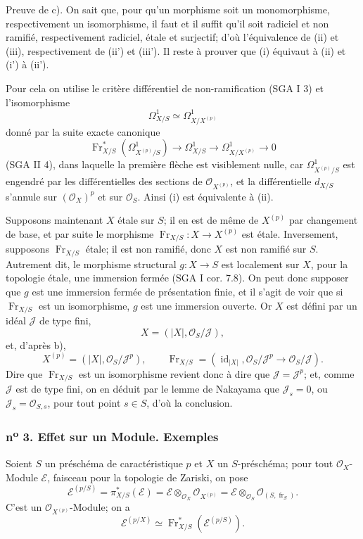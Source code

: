 \documentclass[11pt]{article}
\providecommand{\OO}{\mathcal{O}}
\providecommand{\id}{\operatorname{id}}
\providecommand{\cE}{\mathcal E}
\providecommand{\id}{\operatorname{id}}
\providecommand{\id}{\operatorname{id}}
\providecommand{\id}{\operatorname{id}}
\providecommand{\id}{\operatorname{id}}
\providecommand{\fr}{\operatorname{fr}}
\providecommand{\Fr}{\operatorname{Fr}}
\providecommand{\JJ}{\mathcal J}
\providecommand{\Fr}{\operatorname{Fr}}
\providecommand{\fr}{\operatorname{fr}}
\providecommand{\id}{\operatorname{id}}
\begin{document}
Preuve de c). On sait que, pour qu'un morphisme soit un monomorphisme, respectivement un isomorphisme, il faut et il suffit qu'il soit radiciel et non ramifié, respectivement radiciel, étale et surjectif; d'où l'équivalence de (ii) et (iii), respectivement de (ii') et (iii'). Il reste à prouver que (i) équivaut à (ii) et (i') à (ii').

Pour cela on utilise le critère différentiel de non-ramification (SGA I 3) et l'isomorphisme
\[
\Omega^1_{X/S}\simeq \Omega^1_{X/X^{(p)}}
\]
donné par la suite exacte canonique
\[
\Fr_{X/S}^*(\Omega^1_{X^{(p)}/S})\longrightarrow \Omega^1_{X/S}
\longrightarrow \Omega^1_{X/X^{(p)}}\longrightarrow 0
\]
(SGA II 4), dans laquelle la première flèche est visiblement nulle, car $\Omega^1_{X^{(p)}/S}$ est engendré par les différentielles des sections de $\OO_{X^{(p)}}$, et la différentielle $d_{X/S}$ s'annule sur $(\OO_X)^p$ et sur $\OO_S$. Ainsi (i) est équivalente à (ii).

Supposons maintenant $X$ étale sur $S$; il en est de même de $X^{(p)}$ par changement de base, et par suite le morphisme $\Fr_{X/S}:X\to X^{(p)}$ est étale. Inversement, supposons $\Fr_{X/S}$ étale; il est non ramifié, donc $X$ est non ramifié sur $S$. Autrement dit, le morphisme structural $g:X\to S$ est localement sur $X$, pour la topologie étale, une immersion fermée (SGA I cor. 7.8). On peut donc supposer que $g$ est une immersion fermée de présentation finie, et il s'agit de voir que si $\Fr_{X/S}$ est un isomorphisme, $g$ est une immersion ouverte. Or $X$ est défini par un idéal $\JJ$ de type fini,
\[
X=(|X|,\OO_S/\JJ),
\]
et, d'après b),
\[
X^{(p)}=(|X|,\OO_S/\JJ^p),
\qquad
\Fr_{X/S}=(\id_{|X|},\OO_S/\JJ^p\to\OO_S/\JJ).
\]
Dire que $\Fr_{X/S}$ est un isomorphisme revient donc à dire que $\JJ=\JJ^p$; et, comme $\JJ$ est de type fini, on en déduit par le lemme de Nakayama que $\JJ_s=0$, ou $\JJ_s=\OO_{S,s}$, pour tout point $s\in S$, d'où la conclusion.

\subsubsection*{n\textsuperscript{o} 3. Effet sur un Module. Exemples}

Soient $S$ un préschéma de caractéristique $p$ et $X$ un $S$-préschéma; pour tout $\OO_X$-Module $\cE$, faisceau pour la topologie de Zariski, on pose
\[
\cE^{(p/S)}=\pi_{X/S}^*(\cE)=\cE\otimes_{\OO_X}\OO_{X^{(p)}}
 =\cE\otimes_{\OO_S}\OO_{(S,\fr_S)}.
\]
C'est un $\OO_{X^{(p)}}$-Module; on a
\[
\cE^{(p/X)}\simeq \Fr_{X/S}^*(\cE^{(p/S)}).
\]
\end{document}
